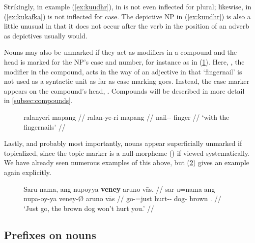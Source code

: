 
Strikingly, in example (\ref{ex:kuudhr}),  in 
 is not even inflected for plural;
likewise,  in (\ref{ex:kukafka}) is not
inflected for case. The depictive NP in (\ref{ex:kuudhr}) is also a little
unusual in that it does not occur after the verb in the position of an adverb
as depictives usually would.

Nouns may also be unmarked if they act as modifiers in a compound and the head
is marked for the NP's case and number, for instance as in
(\ref{ex:compunmkd}). Here, , the modifier in the
compound, acts in the way of an adjective in that `fingernail' is not used as a
syntactic unit as far as case marking goes. Instead, the case marker appears on
the compound's head, . Compounds will be described in
more detail in \autoref{subsec:compounds}.

\begin{figure}[h]
\ex\label{ex:compunmkd}
\begingl
	\gla ralanyeri mapang //
	\glb ralan-ye-ri mapang //
	\glc nail-\Pl{}-\Ins{} finger //
	\glft `with the fingernails' //
\endgl\xe
\end{figure}

Lastly, and probably most importantly, nouns appear superficially unmarked if
topicalized, since the topic marker is a null-morpheme () if viewed
systematically. We have already seen numerous examples of this above, but 
(\ref{ex:topzeromkd}) gives an example again explicitly.

\begin{figure}[h]
\ex\label{ex:topzeromkd}
\begingl
	\gla Saru-nama, ang nupoyya \textbf{veney} aruno vās. //
	\glb sar-u=nama ang nupa-oy-ya veney-Ø aruno vās //
	\glc go-\Imp{}=just \AgtT{} hurt-\Neg{}-\TsgM{} dog-\Top{} brown 
		\Second{}.\Parg{} //
	\glft `Just go, the brown dog won't hurt you.' //
\endgl\xe
\end{figure}


\subsection{Prefixes on nouns}
\label{subsec:nounpref}

